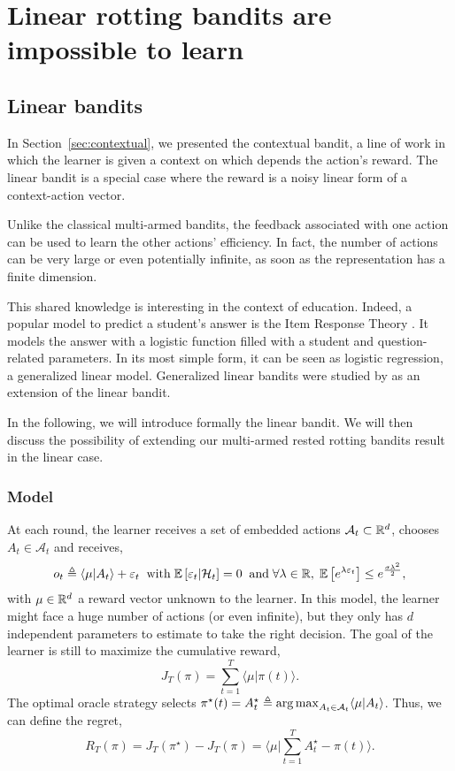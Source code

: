 
\section{Linear rotting bandits are impossible to learn}
\label{sec:linear-rotting}
\subsection{Linear bandits}
\label{ss:linear}
In Section~\ref{sec:contextual}, we presented the contextual bandit, a line of work in which the learner is given a context on which depends the action's reward. The linear bandit is a special case where the reward is a noisy linear form of a context-action vector.

Unlike the classical multi-armed bandits, the feedback associated with one action can be used to learn the other actions' efficiency. In fact, the number of actions can be very large or even potentially infinite, as soon as the representation has a finite dimension. 

This shared knowledge is interesting in the context of education. Indeed, a popular model to predict a student's answer is the Item Response Theory \citep{hambleton2013item}. It models the answer with a logistic function filled with a student and question-related parameters. In its most simple form, it can be seen as logistic regression, a generalized linear model. Generalized linear bandits were studied by \citep{filippi2010parametric} as an extension of the linear bandit.  

In the following, we will introduce formally the linear bandit. We will then discuss the possibility of extending our multi-armed rested rotting bandits result in the linear case. 



\subsubsection{Model} At each round, the learner receives a set of embedded actions $\mathcal{A}_t \subset \mathbb{R}^d$, chooses $A_t \in \mathcal{A}_t$ and receives,
 \begin{equation*}
\label{eq:linear-feedback}
o_{t} \triangleq \langle \mu | A_t \rangle + \varepsilon_t
 \;\; \text{with}\; \mathbb{E}\left[ \varepsilon_t | \mathcal{H}_t \right]= 0 \;\; \text{and} \; \forall \lambda \in \mathbb{R}, \; \mathbb{E}\left[ e^{\lambda\varepsilon_t}\right] \leq e^{\frac{\sigma\lambda^2}{2}},
\end{equation*}
with $\mu \in \mathbb{R}^d$ a reward vector unknown to the learner. In this model, the learner might face a huge number of actions (or even infinite), but they only has $d$ independent parameters to estimate to take the right decision.  The goal of the learner is still to maximize the cumulative reward, 
\begin{equation*}
J_T(\pi) = \sum_{t=1}^T \langle \mu | \pi(t) \rangle. 
\end{equation*}
The optimal oracle strategy selects $\pi^\star(t) = A^\star_t \triangleq \operatorname*{arg\,max}_{A_t \in \mathcal{A}_t} \langle \mu | A_t \rangle$. Thus, we can define the regret, 
\[R_T(\pi) = J_T(\pi^\star) - J_T(\pi) = \langle \mu | \sum_{t=1}^T A^\star_t - \pi(t) \rangle. \]

